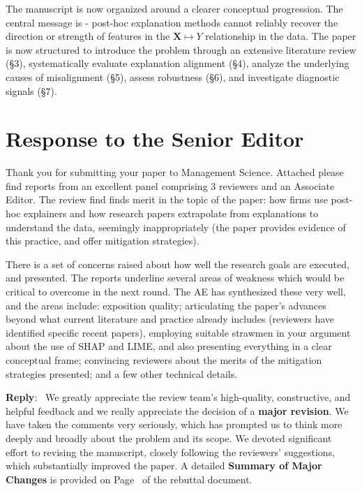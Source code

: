 \documentclass[11pt]{article}
\newcounter{se}[section]
\newenvironment{se*}[1][]{%
    \par\medskip%
    \rmfamily\itshape%
}{\medskip}
\newcounter{reviewer}
\newcommand{\sesection}
{\newpage
\section*{Response to the Senior Editor}}
\newenvironment{reply}
 {\par\medskip \noindent \begin{sf}\textbf{Reply}:\ }
 {\medskip \end{sf}}
\begin{document}
\begin{sf}
\begin{enumerate}
The manuscript is now organized around a clearer conceptual progression. The central message is - post-hoc explanation methods cannot reliably recover the direction or strength of features in the $\mathbf{X} \mapsto Y$ relationship in the data.  The paper is now structured to introduce the problem through an extensive literature review (\S 3), systematically evaluate explanation alignment (\S 4), analyze the underlying causes of misalignment (\S 5), assess robustness (\S 6), and investigate diagnostic signals (\S 7).


\end{enumerate}


\end{sf}

\newpage


\sesection{}


\begin{se*}

Thank you for submitting your paper to Management Science. Attached please find reports from an excellent panel comprising 3 reviewers and an Associate Editor. The review find finds merit in the topic of the paper: how firms use post-hoc explainers and how research papers extrapolate from explanations to understand the data, seemingly inappropriately (the paper provides evidence of this practice, and offer mitigation strategies).


There is a set of concerns raised about how well the research goals are executed, and presented. The reports underline several areas of weakness which would be critical to overcome in the next round. The AE has synthesized these very well, and the areas include: exposition quality; articulating the paper's advances beyond what current literature and practice already includes (reviewers have identified specific recent papers), employing suitable strawmen in your argument about the use of SHAP and LIME, and also presenting everything in a clear conceptual frame; convincing reviewers about the merits of the mitigation strategies presented; and a few other technical details.

\end{se*}

\begin{reply}
We greatly appreciate the review team’s high-quality, constructive, and helpful feedback and we really appreciate the decision of a \textbf{major revision}. We have taken the comments very seriously, which has prompted us to think more deeply and broadly about the problem and its scope. We devoted significant effort to revising the manuscript, closely following the reviewers’ suggestions, which substantially improved the paper. A detailed \textbf{Summary of Major Changes} is provided on Page~\pageref{sec:majorchanges} of the rebuttal document.
\end{reply}
\end{document}
